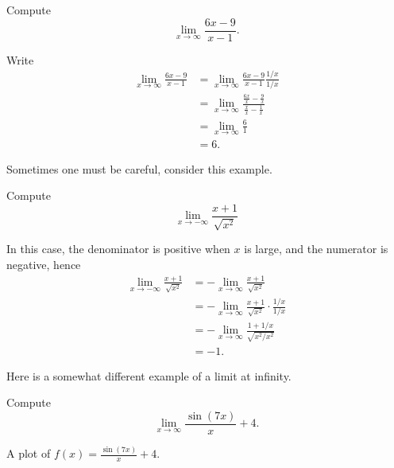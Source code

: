 \begin{example} Compute
\[
\lim_{x\to\infty} \frac{6x-9}{x-1}.
\]
\end{example}


\begin{solution}
Write
\begin{align*}
\lim_{x\to\infty}\frac{6x-9}{x-1} &= \lim_{x\to\infty}\frac{6x-9}{x-1} \frac{1/x}{1/x}\\
&=\lim_{x\to\infty}\frac{\frac{6x}{x} - \frac{9}{x}}{\frac{x}{x} - \frac{1}{x}}\\
&= \lim_{x\to\infty} \frac{6}{1}\\
&= 6.
\end{align*}
\end{solution}

Sometimes one must be careful, consider this example.

\begin{example}
Compute
\[
\lim_{x\to -\infty} \frac{x+1}{\sqrt{x^2}}
\]
\end{example}

\begin{solution}
In this case, the denominator is positive when $x$ is large, and the numerator is negative, hence
\begin{align*}
\lim_{x\to -\infty} \frac{x+1}{\sqrt{x^2}} &= -\lim_{x\to \infty} \frac{x+1}{\sqrt{x^2}}\\
&= -\lim_{x\to \infty} \frac{x+1}{\sqrt{x^2}} \cdot \frac{1/x}{1/x}\\
&= -\lim_{x\to \infty} \frac{1+1/x}{\sqrt{x^2/x^2}}\\
&= -1.
\end{align*}
\end{solution}


Here is a somewhat different example of a limit at infinity.

\begin{example}
Compute
\[
\lim_{x\to \infty} \frac{\sin(7x)}{x}+4.
\]
\end{example}

\begin{marginfigure}[0in]
\caption{A plot of $f(x)=\frac{\sin(7x)}{x}+4$.}
\label{plot:sin7x/x+4}
\end{marginfigure}

